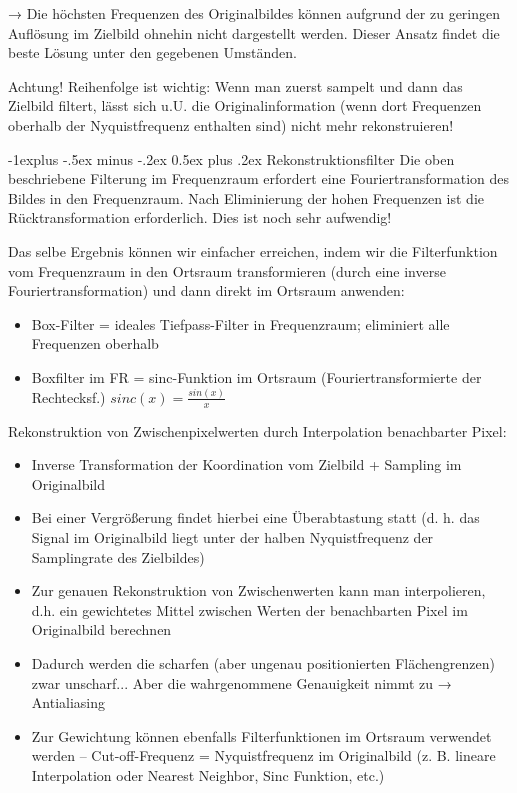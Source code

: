 \documentclass[10pt,landscape]{article}
\makeatletter
\renewcommand{\subsection}{\@startsection{subsection}{2}{0mm}%
                                {-1explus -.5ex minus -.2ex}%
                                {0.5ex plus .2ex}%
                                {\normalfont\normalsize\bfseries}}
\makeatother
\begin{document}
\begin{multicols}{3}
→ Die höchsten Frequenzen des Originalbildes können aufgrund der zu geringen Auflösung im Zielbild ohnehin nicht dargestellt werden. Dieser Ansatz findet die beste Lösung unter den gegebenen Umständen. 

Achtung! Reihenfolge ist wichtig: Wenn man zuerst sampelt und dann das Zielbild filtert, lässt sich u.U. die Originalinformation (wenn dort Frequenzen oberhalb der Nyquistfrequenz enthalten sind) nicht mehr rekonstruieren!

\subsection{Rekonstruktionsfilter}
Die oben beschriebene Filterung im Frequenzraum erfordert eine Fouriertransformation des Bildes in den Frequenzraum. Nach Eliminierung der hohen Frequenzen ist die Rücktransformation erforderlich. Dies ist noch sehr aufwendig!

Das selbe Ergebnis können wir einfacher erreichen, indem wir die Filterfunktion vom Frequenzraum in den Ortsraum transformieren (durch eine inverse Fouriertransformation) und dann direkt im Ortsraum anwenden:
\begin{itemize}
  \item Box-Filter = ideales Tiefpass-Filter in Frequenzraum; eliminiert alle Frequenzen oberhalb
  \item Boxfilter im FR = sinc-Funktion im Ortsraum (Fouriertransformierte der Rechtecksf.) $sinc(x)=\frac{sin(x)}{x}$
\end{itemize}

Rekonstruktion von Zwischenpixelwerten durch Interpolation benachbarter Pixel:
\begin{itemize}
  \item Inverse Transformation der Koordination vom Zielbild + Sampling im Originalbild
  \item Bei einer Vergrößerung findet hierbei eine Überabtastung statt (d. h. das Signal im Originalbild liegt unter der halben Nyquistfrequenz der Samplingrate des Zielbildes)
  \item Zur genauen Rekonstruktion von Zwischenwerten kann man interpolieren, d.h. ein gewichtetes Mittel zwischen Werten der benachbarten Pixel im Originalbild berechnen
  \item Dadurch werden die scharfen (aber ungenau positionierten Flächengrenzen) zwar unscharf... Aber die wahrgenommene Genauigkeit nimmt zu → Antialiasing
  \item Zur Gewichtung können ebenfalls Filterfunktionen im Ortsraum verwendet werden – Cut-off-Frequenz = Nyquistfrequenz im Originalbild (z. B. lineare Interpolation oder Nearest Neighbor, Sinc Funktion, etc.)
\end{itemize}


\end{multicols}
\end{document}
